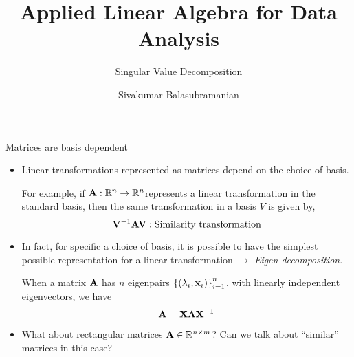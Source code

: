 \documentclass[aspectratio=169]{beamer}
\title{Applied Linear Algebra for Data Analysis}
\subtitle{Singular Value Decomposition}
\author{Sivakumar Balasubramanian}
\institute[Christian Medical College] %
{
  \inst{}%
  Department of Bioengineering\\
  Christian Medical College, Bagayam\\
  Vellore 632002
}
\date{}
\let\olditem\item
\renewcommand{\item}{\setlength{\itemsep}{\fill}\olditem}
\def\mf{\ensuremath\mathbf}
\def\mb{\ensuremath\mathbb}
\def\lp{\ensuremath\left(}
\def\rp{\ensuremath\right)}
\def\lc{\ensuremath\left\{}
\def\rc{\ensuremath\right\}}
\begin{document}


\begin{frame}
  \titlepage
\end{frame}



\begin{frame}[t]{Matrices are basis dependent}
\begin{itemize}
    \item Linear transformations represented as matrices depend on the choice of basis.

    For example, if $\mf{A}: \mb{R}^n \to \mb{R}^n$represents a linear transformation in the standard basis, then the same transformation in a basis $V$ is given by,
    \[ \mf{V}^{-1}\mf{A}\mf{V}: \text{Similarity transformation} \]

    \item In fact, for specific a choice of basis, it is possible to have the simplest possible representation for a linear transformation $\longrightarrow$ \textit{Eigen decomposition}.

    When a matrix $\mf{A}$ has $n$ eigenpairs $\lc\lp\lambda_i, \mf{x}_i\rp\rc_{i=1}^{n}$, with linearly independent eigenvectors, we have
    \[ \mf{A} = \mf{X}\mf{\Lambda}\mf{X}^{-1} \]

    \item What about rectangular matrices $\mf{A} \in \mb{R}^{n \times m}$? Can we talk about ``similar'' matrices in this case?
\end{itemize}
\end{frame}
\end{document}
